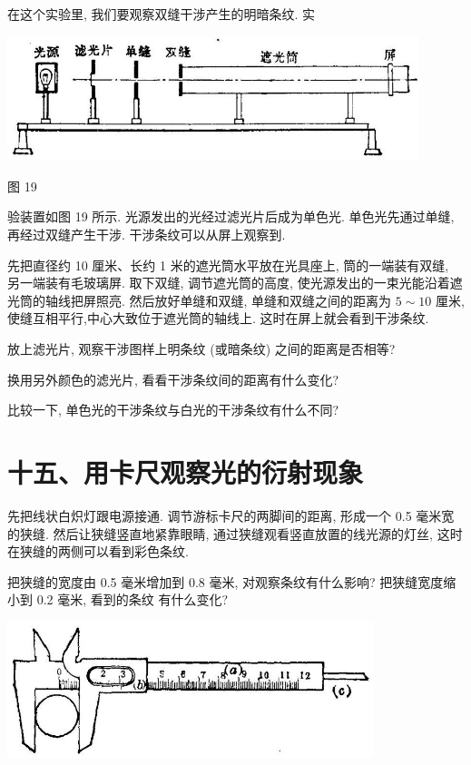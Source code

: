 \documentclass[10pt]{article}
\begin{document}
在这个实验里, 我们要观察双缝干涉产生的明暗条纹. 实

\begin{center}
\includegraphics[max width=0.9\textwidth]{images/01913056-1f15-74d8-9184-9aab52c9d66b_394_910881.jpg}
\end{center}

图 19

验装置如图 19 所示. 光源发出的光经过滤光片后成为单色光. 单色光先通过单缝, 再经过双缝产生干涉. 干涉条纹可以从屏上观察到.

先把直径约 10 厘米、长约 1 米的遮光筒水平放在光具座上, 筒的一端装有双缝, 另一端装有毛玻璃屏. 取下双缝, 调节遮光筒的高度, 使光源发出的一束光能沿着遮光筒的轴线把屏照亮. 然后放好单缝和双缝, 单缝和双缝之间的距离为 \(5 \sim {10}\) 厘米,使缝互相平行,中心大致位于遮光筒的轴线上. 这时在屏上就会看到干涉条纹.

放上滤光片, 观察干涉图样上明条纹 (或暗条纹) 之间的距离是否相等?

换用另外颜色的滤光片, 看看干涉条纹间的距离有什么变化?

比较一下, 单色光的干涉条纹与白光的干涉条纹有什么不同?

\section*{十五、用卡尺观察光的衍射现象}

先把线状白炽灯跟电源接通. 调节游标卡尺的两脚间的距离, 形成一个 0.5 毫米宽的狭缝. 然后让狭缝竖直地紧靠眼睛, 通过狭缝观看竖直放置的线光源的灯丝, 这时在狭缝的两侧可以看到彩色条纹.

把狭缝的宽度由 0.5 毫米增加到 0.8 毫米, 对观察条纹有什么影响? 把狭缝宽度缩小到 0.2 毫米, 看到的条纹 有什么变化?

\begin{center}
\includegraphics[max width=0.8\textwidth]{images/01913056-1f15-74d8-9184-9aab52c9d66b_395_886149.jpg}
\end{center}
\end{document}
